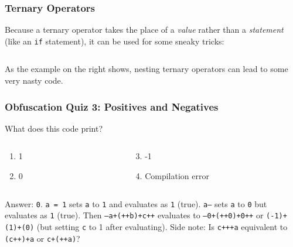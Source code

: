 \documentclass[xcolor]{beamer}
\begin{document}
\begin{frame}
	\frametitle{Ternary Operators}
	\pause
	
	Because a ternary operator takes the place of a \textit{value} rather than a \textit{statement} (like an \texttt{if} statement), it can be used for some sneaky tricks:
	\pause
	
	\begin{columns}
		\begin{column}{0.45\textwidth}
			\centering
			
		\end{column}
		\pause
		\begin{column}{0.45\textwidth}
			\centering
			
		\end{column}
	\end{columns}
	
	As the example on the right shows, nesting ternary operators can lead to some very nasty code.
\end{frame}

\begin{frame}
	\frametitle{Obfuscation Quiz 3: Positives and Negatives}
	\pause
	
	What does this code print?
	
	
	\pause
	
	\begin{columns}
		\begin{column}{0.45\textwidth}
			\begin{enumerate}
				\item 1
				\pause
				\item 0
			\end{enumerate}
		\end{column}
		\pause
		\begin{column}{0.45\textwidth}
			\begin{enumerate}
				\setcounter{enumi}{2}
				\item -1
				\pause
				\item Compilation error
			\end{enumerate}
		\end{column}
	\end{columns}
	\pause
	
	\vspace{0.5cm}
	
	Answer: \texttt{0}. \pause \texttt{a = 1} sets \texttt{a} to \texttt{1} and evaluates as \texttt{1} (true). \pause \texttt{a--} sets \texttt{a} to \texttt{0} but evaluates as \texttt{1} (true). \pause Then \texttt{--a+(++b)+c++} evaluates to \texttt{--0+(++0)+0++} or \texttt{(-1)+(1)+(0)} (but setting \texttt{c} to 1 after evaluating). \pause Side note: Is \texttt{c+++a} equivalent to \texttt{(c++)+a} or \texttt{c+(++a)}?
\end{frame}
\end{document}
